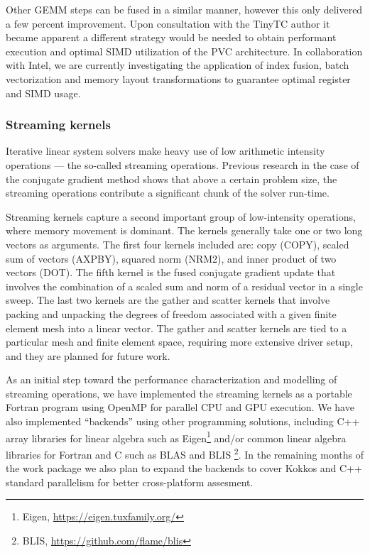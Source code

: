 \documentclass[a4paper,12pt, numbers]{article}
\begin{document}
Other GEMM steps can be fused in a similar manner, however this only delivered a few percent improvement. Upon consultation with the TinyTC author it became apparent a different strategy would be needed to obtain performant execution and optimal SIMD utilization of the PVC architecture.
In collaboration with Intel, we are currently investigating the application of index fusion, batch vectorization and memory layout transformations to guarantee optimal register and SIMD usage.


\subsubsection*{Streaming kernels}

Iterative linear system solvers make heavy use of low arithmetic intensity operations --- the so-called streaming operations.
Previous research in the case of the conjugate gradient method shows that above a certain problem size, the streaming operations contribute a significant chunk of the solver run-time.

Streaming kernels capture a second important group of low-intensity operations, where memory movement is dominant.
The kernels generally take one or two long vectors as arguments. The first four kernels included are: copy (COPY), scaled sum of vectors (AXPBY), squared norm (NRM2), and inner product of two vectors (DOT). The fifth kernel is the fused conjugate gradient update that involves the combination of a scaled sum and norm of a residual vector in a single sweep. The last two kernels are the gather and scatter kernels that involve packing and unpacking the degrees of freedom associated with a given finite element mesh into a linear vector. The gather and scatter kernels are tied to a particular mesh and finite element space, requiring more extensive driver setup, and they are planned for future work. 

As an initial step toward the performance characterization and modelling of streaming operations, we have implemented the streaming kernels as a portable Fortran program using OpenMP for parallel CPU and GPU execution. We have also implemented ``backends'' using other programming solutions, including C++ array libraries for linear algebra such as Eigen\footnote{Eigen, \url{https://eigen.tuxfamily.org/}} and/or common linear algebra libraries for Fortran and C such as BLAS and BLIS \footnote{BLIS, \url{https://github.com/flame/blis}}. In the remaining months of the work package we also plan to expand the backends to cover Kokkos and C++ standard parallelism for better cross-platform assesment. 
\end{document}
